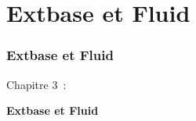 %

\section{Extbase et Fluid}
\begin{frame}[fragile]
	\frametitle{Extbase et Fluid}

	\begin{center}\huge{Chapitre 3~:}\end{center}
	\begin{center}\huge{\color{typo3darkgrey}\textbf{Extbase et Fluid}}\end{center}

\end{frame}

